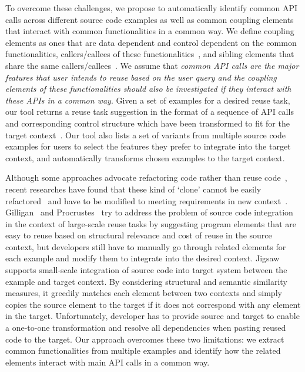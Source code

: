 To overcome these challenges, we propose to automatically identify common API calls across different source code examples as well as common coupling elements that interact with common functionalities in a common way. We define coupling elements as ones that are data dependent and control dependent on the common functionalities, callers/callees of these functionalities~\cite{Robillard:FSE05},  and sibling elements that share the same callers/callees~\cite{Devanbu:randomWalk07}.  We assume that \textit{common API calls are the major features that user intends to reuse based on the user query and the coupling elements of these functionalities should also be investigated if they interact with these APIs in a common way}. Given a set of examples for a desired reuse task, our tool returns a reuse task suggestion in the format of a sequence of API calls and corresponding control structure which have been transformed to fit for the target context~\cite{Cottrell:jigsaw08}. Our tool also lists a set of variants from multiple source code examples for users to select the features they prefer to integrate into the target context, and automatically transforms chosen examples to the target context.

Although some approaches advocate refactoring code rather than reuse code~\cite{fowler:refactoring}, recent researches have found that these kind of `clone' cannot be easily refactored~\cite{Kim:cloneGenealogy05} and have to be modified to meeting requirements in new context~\cite{Selby:largeReuse05}. Gilligan~\cite{Holmes:reuse07} and Procrustes~\cite{Holmes:ASE09} try to address the problem of source code integration in the context of large-scale reuse tasks by suggesting program elements that are easy to reuse based on structural relevance and cost of reuse in the source context, but developers still have to manually go through related elements for each example and modify them to integrate into the desired context. Jigsaw~\cite{Cottrell:jigsaw08} supports small-scale integration of source code into target system  between the example and target context. By considering structural and semantic similarity measures, it greedily matches each element between two contexts and simply copies the source element to the target if it does not correspond with any element in the target. Unfortunately, developer has to provide source and target to enable a one-to-one transformation and resolve all dependencies when pasting reused code to the target.  Our approach overcomes these two limitations: we extract common functionalities from multiple examples and identify how the related elements interact with main API calls in a common way.


